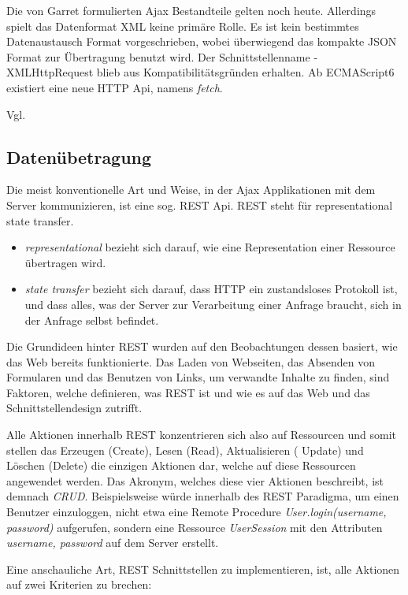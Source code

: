 Die von Garret formulierten Ajax Bestandteile gelten noch heute. Allerdings spielt das Datenformat XML keine primäre Rolle. Es ist kein bestimmtes Datenaustausch Format vorgeschrieben, wobei überwiegend das kompakte JSON Format zur Übertragung benutzt wird. Der Schnittstellenname - XMLHttpRequest blieb aus Kompatibilitätsgründen erhalten. Ab ECMAScript6 existiert eine neue HTTP Api, namens \emph{fetch}.

Vgl. \cite{Garrett:2005}

\subsection{Datenübetragung}

Die meist konventionelle Art und Weise, in der Ajax Applikationen mit dem Server kommunizieren, ist eine sog. REST Api. REST steht für representational state transfer.

\begin{itemize}
\item \emph{representational} bezieht sich darauf, wie eine Representation einer Ressource übertragen wird.
\item \emph{state transfer} bezieht sich darauf, dass HTTP ein zustandsloses Protokoll ist, und dass alles, was der Server zur Verarbeitung einer Anfrage braucht, sich in der Anfrage selbst befindet.
\end{itemize}

Die Grundideen hinter REST wurden auf den Beobachtungen dessen basiert, wie das Web bereits funktionierte. Das Laden von Webseiten, das Absenden von Formularen und das Benutzen von Links, um verwandte Inhalte zu finden, sind Faktoren, welche definieren, was REST ist und wie es auf das Web und das Schnittstellendesign zutrifft.

Alle Aktionen innerhalb REST konzentrieren sich also auf Ressourcen und somit stellen das Erzeugen (Create), Lesen (Read), Aktualisieren ( Update) und Löschen (Delete) die einzigen Aktionen dar, welche auf diese Ressourcen angewendet werden. Das Akronym, welches diese vier Aktionen beschreibt, ist demnach \emph{CRUD}. Beispielsweise würde innerhalb des REST Paradigma, um einen Benutzer einzuloggen, nicht etwa eine Remote Procedure \emph{User.login(username, password)} aufgerufen, sondern eine Ressource \emph{UserSession} mit den Attributen \emph{username, password} auf dem Server erstellt.

Eine anschauliche Art, REST Schnittstellen zu implementieren, ist, alle Aktionen auf zwei Kriterien zu brechen:

